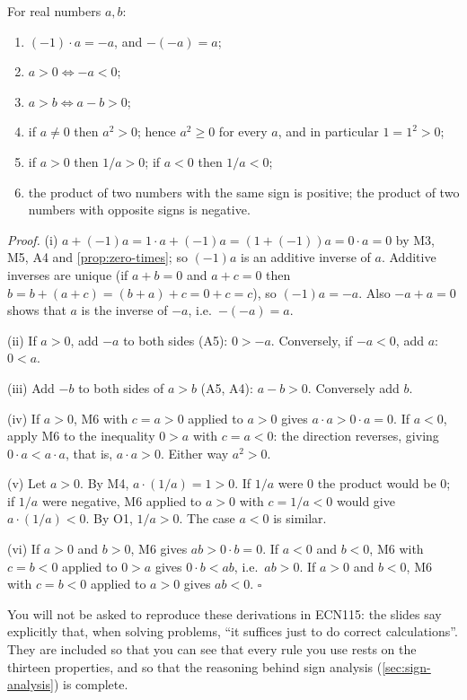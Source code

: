 \begin{proposition}
For real numbers $a,b$:
\begin{enumerate}[label=(\roman*)]
  \item $(-1)\cdot a=-a$, and $-(-a)=a$;
  \item $a>0\Leftrightarrow -a<0$;
  \item $a>b\Leftrightarrow a-b>0$;
  \item if $a\ne0$ then $a^2>0$; hence $a^2\ge0$ for every $a$, and in particular $1=1^2>0$;
  \item if $a>0$ then $1/a>0$; if $a<0$ then $1/a<0$;
  \item the product of two numbers with the same sign is positive; the product of two numbers with opposite
  signs is negative.
\end{enumerate}
\end{proposition}
\emph{Proof.} (i) $a+(-1)a=1\cdot a+(-1)a=(1+(-1))a=0\cdot a=0$ by M3, M5, A4 and \cref{prop:zero-times}; so
$(-1)a$ is an additive inverse of $a$. Additive inverses are unique (if $a+b=0$ and $a+c=0$ then
$b=b+(a+c)=(b+a)+c=0+c=c$), so $(-1)a=-a$. Also $-a+a=0$ shows that $a$ is the inverse of $-a$, i.e.\ $-(-a)=a$.

(ii) If $a>0$, add $-a$ to both sides (A5): $0>-a$. Conversely, if $-a<0$, add $a$: $0<a$.

(iii) Add $-b$ to both sides of $a>b$ (A5, A4): $a-b>0$. Conversely add $b$.

(iv) If $a>0$, M6 with $c=a>0$ applied to $a>0$ gives $a\cdot a>0\cdot a=0$. If $a<0$, apply M6 to the
inequality $0>a$ with $c=a<0$: the direction reverses, giving $0\cdot a<a\cdot a$, that is, $a\cdot a>0$.
Either way $a^2>0$.

(v) Let $a>0$. By M4, $a\cdot(1/a)=1>0$. If $1/a$ were $0$ the product would be $0$; if $1/a$ were negative,
M6 applied to $a>0$ with $c=1/a<0$ would give $a\cdot(1/a)<0$. By O1, $1/a>0$. The case $a<0$ is similar.

(vi) If $a>0$ and $b>0$, M6 gives $ab>0\cdot b=0$. If $a<0$ and $b<0$, M6 with $c=b<0$ applied to $0>a$ gives
$0\cdot b<ab$, i.e.\ $ab>0$. If $a>0$ and $b<0$, M6 with $c=b<0$ applied to $a>0$ gives $ab<0$. \hfill$\square$

\begin{note}
You will not be asked to reproduce these derivations in ECN115: the slides say explicitly that, when solving
problems, ``it suffices just to do correct calculations''. They are included so that you can see that every
rule you use rests on the thirteen properties, and so that the reasoning behind sign analysis
(\cref{sec:sign-analysis}) is complete.
\end{note}

